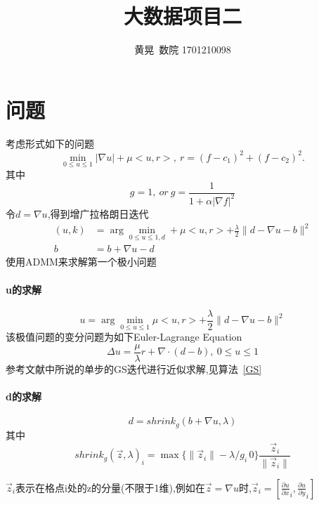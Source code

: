 \documentclass[UTF8]{ctexart}
\author{黄晃\ 数院 1701210098 }
\title{大数据项目二}
\begin{document}
  \maketitle

  
  \section{问题}
  考虑形式如下的问题
  $$
  \min_{0 \leq u \leq 1} |\nabla u|+\mu <u,r>,\ r=(f-c_1)^2+(f-c_2)^2.
  $$
  其中$$
  g=1,\ or\ g=\frac{1}{1+\alpha |\nabla f|^2}
  $$
  令$d=\nabla u$,得到增广拉格朗日迭代
$$
\begin{aligned}
(u,k) & = \arg \min_{0\leq u \leq 1,d} + \mu<u,r> +\frac{\lambda}{2}\|d-\nabla u - b\|^2  \\
b &= b+\nabla u -d  
\end{aligned}
	     $$
   使用ADMM来求解第一个极小问题
  \paragraph{u的求解}
  $$
  u = \arg\min_{0 \leq u \leq 1} \mu <u,r> + \frac{\lambda}{2}\|d-\nabla u -b\|^2
  $$
  该极值问题的变分问题为如下Euler-Lagrange Equation
  \begin{equation}\label{Euler}
  \Delta u = \frac{\mu}{\lambda}r+\nabla \cdot (d-b),\ 0\leq u\leq 1 
  \end{equation}
  参考文献中所说的单步的GS迭代进行近似求解,见算法~\ref{GS}
  \paragraph{d的求解}
  $$
  d = shrink_g(b+\nabla u, \lambda)
  $$
  其中
  $$shrink_g(\overrightarrow{z},\lambda)_i=\max\{\|\overrightarrow{z}_i\|-\lambda/g_i\,0\}\frac{\overrightarrow{z}_i}{\|\overrightarrow{z}_i\|}$$
  
  $\overrightarrow{z}_i$表示在格点i处的z的分量(不限于1维),例如在$\overrightarrow{z}=\nabla  u$时,$\overrightarrow{z}_i=[\frac{\partial u}{\partial x}_i,\frac{\partial u}{\partial y}_i]$

\begin{algorithm}
    \SetAlgoNoLine %

    \BlankLine

    \caption{$GS_{GCS}$\label{GS}}
\end{algorithm}
    
\end{document}
